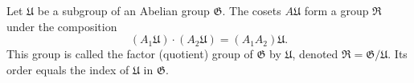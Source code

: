 Let $\mathfrak{U}$ be a subgroup of an Abelian group $\mathfrak{G}$. The cosets $A\mathfrak{U}$ form a group $\mathfrak{R}$ under the composition
$$(A_1\mathfrak{U}) \cdot (A_2\mathfrak{U}) = (A_1 A_2)\mathfrak{U}.$$
This group is called the factor (quotient) group of $\mathfrak{G}$ by $\mathfrak{U}$, denoted $\mathfrak{R} = \mathfrak{G}/\mathfrak{U}$. Its order equals the index of $\mathfrak{U}$ in $\mathfrak{G}$.
